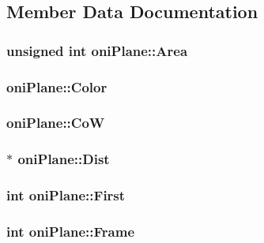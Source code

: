 \subsection{Member Data Documentation}
\hypertarget{classoni_plane_a5fd10add329c5a691cdbeabe0544d0a7}{
\subsubsection[{Area}]{\setlength{\rightskip}{0pt plus 5cm}unsigned int oni\-Plane\-::\-Area}}\label{classoni_plane_a5fd10add329c5a691cdbeabe0544d0a7}
\hypertarget{classoni_plane_a4b3dddc3df25b2a09d40e0bfb6382bef}{
\subsubsection[{Color}]{ oni\-Plane\-::\-Color}}\label{classoni_plane_a4b3dddc3df25b2a09d40e0bfb6382bef}
\hypertarget{classoni_plane_a9abe6029f64b043610124e75e9cb59e1}{
\subsubsection[{Co\-W}]{ oni\-Plane\-::\-Co\-W}}\label{classoni_plane_a9abe6029f64b043610124e75e9cb59e1}
\hypertarget{classoni_plane_a94c9179a4a465e6af6b0933bd8830dd5}{
\subsubsection[{Dist}]{$\ast$ oni\-Plane\-::\-Dist}}\label{classoni_plane_a94c9179a4a465e6af6b0933bd8830dd5}
\hypertarget{classoni_plane_a2e074a995873b6ee68b72139a804f58e}{
\subsubsection[{First}]{\setlength{\rightskip}{0pt plus 5cm}int oni\-Plane\-::\-First}}\label{classoni_plane_a2e074a995873b6ee68b72139a804f58e}
\hypertarget{classoni_plane_a320042420f8fc8bb7e9627d20b03770a}{
\subsubsection[{Frame}]{\setlength{\rightskip}{0pt plus 5cm}int oni\-Plane\-::\-Frame}}\label{classoni_plane_a320042420f8fc8bb7e9627d20b03770a}
